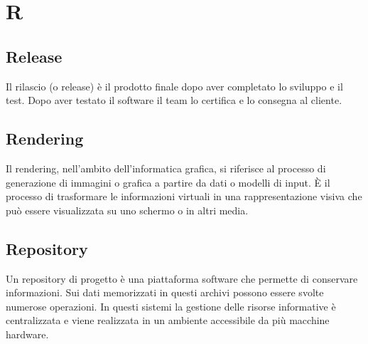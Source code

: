 \section{R}
 \subsection{Release}%
 Il rilascio (o release) è il prodotto finale dopo aver completato lo sviluppo e il test. Dopo aver testato il software il team lo certifica e lo consegna al cliente.
 
 \subsection{Rendering}
 Il rendering, nell'ambito dell'informatica grafica, si riferisce al processo di generazione di immagini o grafica a partire da dati o modelli di input. È il processo di trasformare le informazioni virtuali in una rappresentazione visiva che può essere visualizzata su uno schermo o in altri media.
 
 \subsection{Repository}%
 Un repository di progetto è una piattaforma software che permette di conservare informazioni. Sui dati memorizzati in questi archivi possono essere svolte numerose operazioni. In questi sistemi la gestione delle risorse informative è centralizzata e viene realizzata in un ambiente accessibile da più macchine hardware.
 
\clearpage